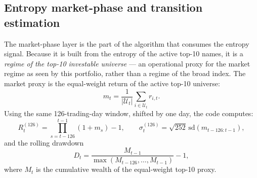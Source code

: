 \documentclass[a4paper,12pt]{article}
\begin{document}
\subsection{Entropy market-phase and transition estimation}
\label{sec:regime}

The market-phase layer is the part of the algorithm that consumes the entropy signal. Because it is built from the entropy of the active top-10 names, it is a \emph{regime of the top-10 investable universe} --- an operational proxy for the market regime as seen by this portfolio, rather than a regime of the broad index. The market proxy is the equal-weight return of the active top-10 universe:
\[
m_t=\frac{1}{|\mathcal{U}_t|}\sum_{i\in\mathcal{U}_t}r_{i,t}.
\]
Using the same 126-trading-day window, shifted by one day, the code computes:
\[
R_t^{(126)}=\prod_{s=t-126}^{t-1}(1+m_s)-1,\qquad
\sigma_t^{(126)}=\sqrt{252}\,\mathrm{sd}(m_{t-126:t-1}),
\]
and the rolling drawdown
\[
D_t=\frac{M_{t-1}}{\max(M_{t-126},\ldots,M_{t-1})}-1,
\]
where $M_t$ is the cumulative wealth of the equal-weight top-10 proxy.
\end{document}
